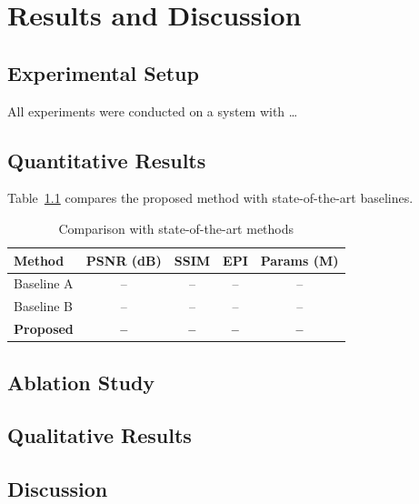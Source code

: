
\chapter{Results and Discussion}
\label{ch:results}

\section{Experimental Setup}
\label{sec:expsetup}

All experiments were conducted on a system with \ldots

\section{Quantitative Results}
\label{sec:quant}

Table~\ref{tab:comparison} compares the proposed method with state-of-the-art
baselines.

\begin{table}[H]
  \centering
  \caption{Comparison with state-of-the-art methods}
  \label{tab:comparison}
  \begin{tabular}{lcccc}
    \toprule
    \textbf{Method} & \textbf{PSNR (dB)} & \textbf{SSIM} & \textbf{EPI} &
      \textbf{Params (M)} \\
    \midrule
    Baseline A      & --   & --   & --   & -- \\
    Baseline B      & --   & --   & --   & -- \\
    \textbf{Proposed} & \textbf{--} & \textbf{--} & \textbf{--} & \textbf{--} \\
    \bottomrule
  \end{tabular}
\end{table}

\section{Ablation Study}
\label{sec:ablation}

\section{Qualitative Results}
\label{sec:qual}

\section{Discussion}
\label{sec:discussion}
